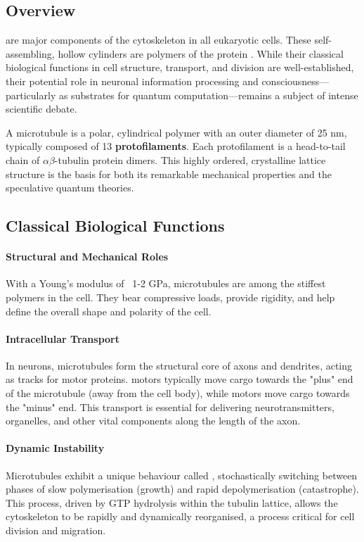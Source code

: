 \subsection{Overview}

 are major components of the cytoskeleton in all eukaryotic cells. These self-assembling, hollow cylinders are polymers of the protein . While their classical biological functions in cell structure, transport, and division are well-established, their potential role in neuronal information processing and consciousness—particularly as substrates for quantum computation—remains a subject of intense scientific debate.

\begin{keyconcept}
    A microtubule is a polar, cylindrical polymer with an outer diameter of 25 nm, typically composed of 13 \textbf{protofilaments}. Each protofilament is a head-to-tail chain of $\alpha\beta$-tubulin protein dimers. This highly ordered, crystalline lattice structure is the basis for both its remarkable mechanical properties and the speculative quantum theories.
\end{keyconcept}


\subsection{Classical Biological Functions}

\paragraph{Structural and Mechanical Roles}
With a Young's modulus of ~1-2 GPa, microtubules are among the stiffest polymers in the cell. They bear compressive loads, provide rigidity, and help define the overall shape and polarity of the cell.

\paragraph{Intracellular Transport}
In neurons, microtubules form the structural core of axons and dendrites, acting as tracks for motor proteins.  motors typically move cargo towards the "plus" end of the microtubule (away from the cell body), while  motors move cargo towards the "minus" end. This transport is essential for delivering neurotransmitters, organelles, and other vital components along the length of the axon.

\paragraph{Dynamic Instability}
Microtubules exhibit a unique behaviour called , stochastically switching between phases of slow polymerisation (growth) and rapid depolymerisation (catastrophe). This process, driven by GTP hydrolysis within the tubulin lattice, allows the cytoskeleton to be rapidly and dynamically reorganised, a process critical for cell division and migration.


